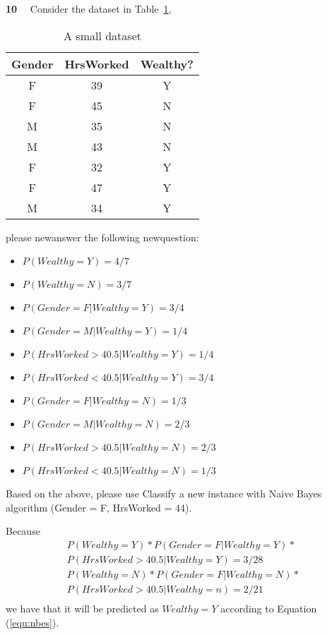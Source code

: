 \begin{newquestion}{\textbf{10}~~}
Consider the dataset in Table~\ref{tab:workhours}, 
\begin{table}[h!]
    \centering
    \begin{tabular}{|c|c|c|}
    \hline
       Gender  & HrsWorked & Wealthy? \\
       \hline
       F  & 39 & Y \\
       F  & 45 & N \\
       M  & 35 & N \\
       M  & 43 & N \\
       F  & 32 & Y \\
       F  & 47 & Y \\
       M  & 34 & Y \\
       \hline
    \end{tabular}
    \caption{A small dataset}
    \label{tab:workhours}
\end{table}
please newanswer the following newquestion:
\begin{itemize}
    \item $P(Wealthy=Y) = 4/7 $
    \item $P(Wealthy=N)= 3/7 $
    \item $P(Gender=F | Wealthy = Y) = 3/4$
    \item $P(Gender=M | Wealthy = Y) = 1/4 $
    \item $P(HrsWorked > 40.5 | Wealthy = Y) = 1/4$
    \item $P(HrsWorked < 40.5 | Wealthy = Y) = 3/4$
    \item $P(Gender=F | Wealthy = N) = 1/3$
    \item $P(Gender=M | Wealthy = N) = 2/3 $
    \item $P(HrsWorked > 40.5 | Wealthy = N) = 2/3$
    \item $P(HrsWorked < 40.5 | Wealthy = N) =1/3$
\end{itemize}
Based on the above, please use 
Classify a new instance with Naive Bayes algorithm (Gender = F,  HrsWorked = 44). 
\end{newquestion}
\begin{newanswer*}
Because 
\begin{equation}
\begin{array}{l}
    P(Wealthy=Y)*P(Gender=F | Wealthy = Y)*\\
    P(HrsWorked > 40.5 | Wealthy = Y) =  3/28\\
     P(Wealthy=N)*P(Gender=F | Wealthy = N)*\\
     P(HrsWorked > 40.5 | Wealthy = n) =   2/21\\   
\end{array}
\end{equation}
we have that it will be predicted as $Wealthy=Y$ according to Equation (\ref{equ:nbes}).
\end{newanswer*}